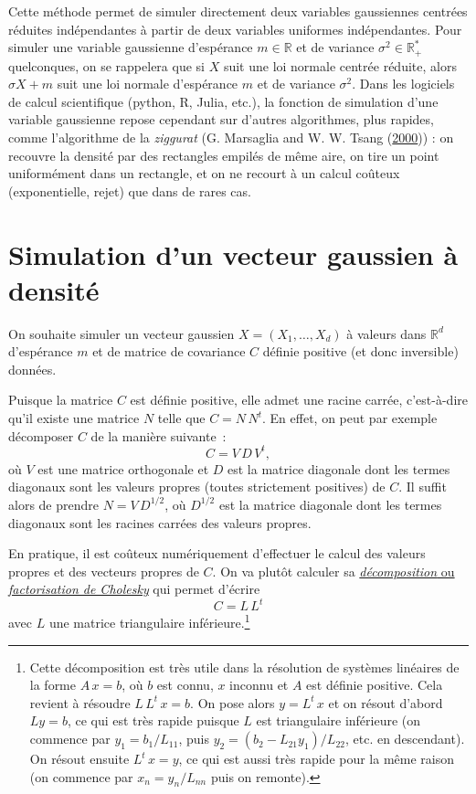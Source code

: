 Cette méthode permet de simuler directement deux variables gaussiennes
centrées réduites indépendantes à partir de deux variables uniformes
indépendantes. Pour simuler une variable gaussienne d'espérance
\(m \in \mathbb{R}\) et de variance \(\sigma^2 \in \mathbb{R}_+^\ast\)
quelconques, on se rappelera que si \(X\) suit une loi normale centrée
réduite, alors \(\sigma X + m\) suit une loi normale d'espérance \(m\)
et de variance \(\sigma^2\). Dans les logiciels de calcul scientifique (python, R, Julia, etc.), la fonction de simulation d'une variable gaussienne repose cependant sur d'autres algorithmes, plus rapides, comme l'algorithme de la \emph{ziggurat} (G. Marsaglia and W. W. Tsang
(\protect\hyperlink{refV-Ziggurat}{2000})) : on recouvre la densité par
des rectangles empilés de même aire, on tire un point uniformément dans
un rectangle, et on ne recourt à un calcul coûteux (exponentielle, rejet) que dans de rares cas.

\chapter{Simulation d'un vecteur gaussien à
densité}\label{V-simulation-dun-vecteur-gaussien-uxe0-densituxe9}

On souhaite simuler un vecteur gaussien \(X = (X_1,\ldots,X_d)\) à
valeurs dans \(\mathbb{R}^d\) d'espérance \(m\) et de matrice de
covariance \(C\) définie positive (et donc inversible) données.

Puisque la matrice \(C\) est définie positive, elle admet une racine
carrée, c'est-à-dire qu'il existe une matrice \(N\) telle que
\(C = N\,N^t\). En effet, on peut par exemple décomposer \(C\) de la
manière suivante~: \[C = V\,D\,V^t,\] où \(V\) est une matrice
orthogonale et \(D\) est la matrice diagonale dont les termes diagonaux
sont les valeurs propres (toutes strictement positives) de \(C\). Il
suffit alors de prendre \(N = V\,D^{1/2}\), où \(D^{1/2}\) est la
matrice diagonale dont les termes diagonaux sont les racines carrées des
valeurs propres.

En pratique, il est coûteux numériquement d'effectuer le calcul des
valeurs propres et des vecteurs propres de \(C\). On va plutôt calculer
sa
\href{https://fr.wikipedia.org/wiki/Factorisation_de_Cholesky}{\emph{décomposition}
ou \emph{factorisation de Cholesky}} qui permet d'écrire \[C = L\,L^t\]
avec \(L\) une matrice triangulaire inférieure.\footnote{Cette
  décomposition est très utile dans la résolution de systèmes linéaires
  de la forme \(A\,x = b\), où \(b\) est connu, \(x\) inconnu et \(A\)
  est définie positive. Cela revient à résoudre \(L\,L^t\,x = b\). On
  pose alors \(y = L^t\,x\) et on résout d'abord \(Ly=b\), ce qui est
  très rapide puisque \(L\) est triangulaire inférieure (on commence par
  \(y_1 = b_1/L_{11}\), puis \(y_2 = (b_2 - L_{21}y_1)/L_{22}\), etc. en
  descendant). On résout ensuite \(L^t\,x = y\), ce qui est aussi très
  rapide pour la même raison (on commence par \(x_n = y_n/L_{nn}\) puis
  on remonte).}

